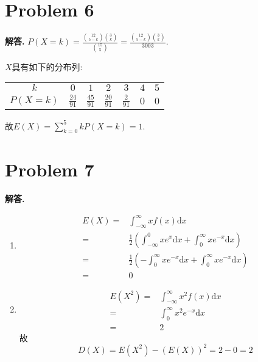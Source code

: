 \documentclass[11pt]{article}
\newenvironment{solution}{\par\noindent\textbf{解答. }}{\par}
\renewcommand{\d}{\mathrm{d}}
\begin{document}
	\section{Problem 6}
	
	\begin{solution}
		$P(X=k)=\frac{{12\choose 5-k}{3\choose k}}{{15\choose 5}}=\frac{{12\choose 5-k}{3\choose k}}{3003}$.
		
		$X$具有如下的分布列:
		
		\begin{table}[htbp]
			\centering
			\begin{tabular}{ccccccc}
				$k$      & $0$            & $1$             & $2$            & $3$            & $4$ & $5$ \\
				$P(X=k)$ & $\frac{24}{91}$ & $\frac{45}{91}$ & $\frac{20}{91}$ & $\frac{2}{91}$ & $0$ & $0$
		\end{tabular}
	\end{table}
		故$E(X)=\sum_{k=0}^5 kP(X=k)=1$.
	\end{solution}

	\section{Problem 7}
	\begin{solution}
		\begin{enumerate}[(1)]
			\item $$\begin{aligned}
				E(X)=&\int_{-\infty}^\infty xf(x)\d x \\
				=& \frac{1}{2}\left(\int_{-\infty}^0 xe^x\d x +\int_0^{\infty} xe^{-x}\d x\right) \\
				=& \frac{1}{2}\left(-\int_{0}^{\infty}xe^{-x}\d x+\int_0^{\infty} xe^{-x}\d x\right) \\
				=& 0
			\end{aligned}$$
		
			\item $$\begin{aligned}
				E(X^2)=&\int_{-\infty}^\infty x^2f(x)\d x \\
				=& \int_0^\infty x^2e^{-x}\d x \\
				=& 2
			\end{aligned} $$
			故 $$D(X)=E(X^2)-(E(X))^2=2-0=2$$
		\end{enumerate}
	\end{solution}
\end{document}
